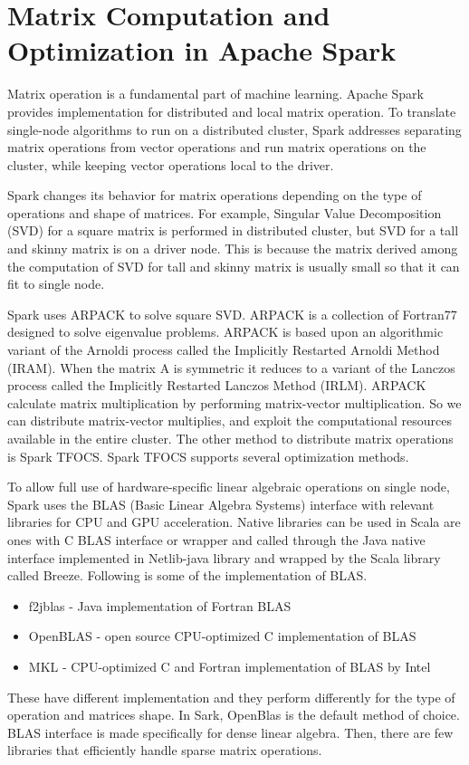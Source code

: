 \section{Matrix Computation and Optimization in Apache Spark}
\label{sec:history}


Matrix operation is a fundamental part of machine learning. Apache Spark provides implementation for distributed and local matrix operation. 
To translate single-node algorithms to run on a distributed cluster, Spark addresses separating matrix operations from vector operations and run matrix operations on the cluster, 
while keeping vector operations local to the driver. 

Spark changes its behavior for matrix operations depending on the type of operations and shape of matrices. For example, Singular Value Decomposition (SVD) for a square matrix is performed in distributed cluster, 
but SVD for a tall and skinny matrix is on a driver node. This is because the matrix derived among the computation of SVD for tall and skinny matrix is usually small so that it can fit to single node.

Spark uses ARPACK to solve square SVD. ARPACK is a collection of Fortran77 designed to solve eigenvalue problems. ARPACK is based upon an algorithmic variant of the Arnoldi process called the Implicitly Restarted Arnoldi Method (IRAM). 
When the matrix A is symmetric it reduces to a variant of the Lanczos process called the Implicitly Restarted Lanczos Method (IRLM). 
ARPACK calculate matrix multiplication by performing matrix-vector multiplication. So we can distribute matrix-vector multiplies, and exploit the computational resources available in the entire cluster. 
The other method to distribute matrix operations is Spark TFOCS. Spark TFOCS supports several optimization methods.

To allow full use of hardware-specific linear algebraic operations on single node, Spark uses the BLAS (Basic Linear Algebra Systems) interface with relevant libraries for CPU and GPU acceleration. 
Native libraries can be used in Scala are ones with C BLAS interface or wrapper and called through the Java native interface implemented in Netlib-java library and wrapped by the Scala library called Breeze. 
Following is some of the implementation of BLAS.

\begin{itemize}
    \item f2jblas -  Java implementation of Fortran BLAS
    \item OpenBLAS - open source CPU-optimized C implementation of BLAS
    \item MKL - CPU-optimized C and Fortran implementation of BLAS by Intel
\end{itemize}

These have different implementation and they perform differently for the type of operation and matrices shape. 
In Sark, OpenBlas is the default method of choice. BLAS interface is made specifically for dense linear algebra. 
Then, there are few libraries that efficiently handle sparse matrix operations.

